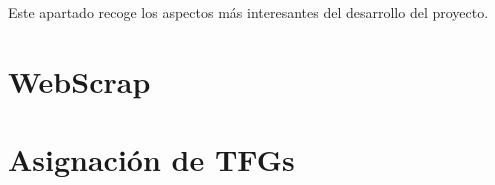 
Este apartado recoge los aspectos más interesantes del desarrollo del proyecto.

\section{WebScrap}

\section{Asignación de TFGs}
